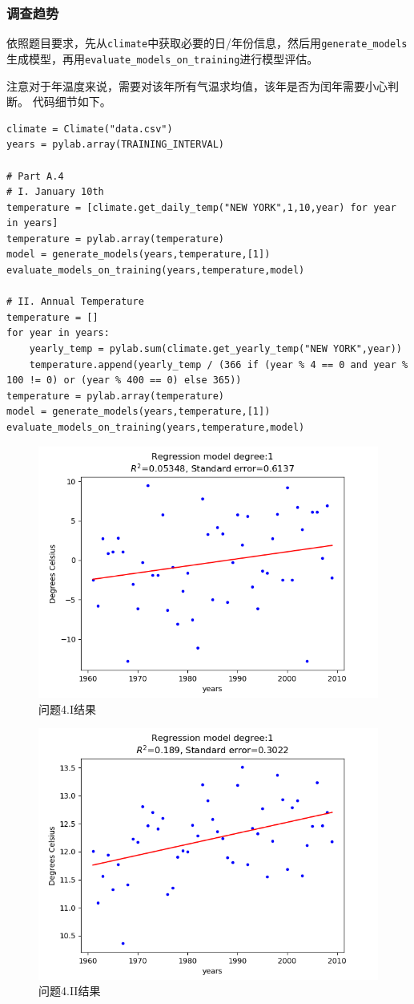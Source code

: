 \documentclass[logo,reportComp]{thesis}
\begin{document}
\subsubsection{调查趋势}
依照题目要求，先从\verb'climate'中获取必要的日/年份信息，然后用\verb'generate_models'生成模型，再用\verb'evaluate_models_on_training'进行模型评估。

注意对于年温度来说，需要对该年所有气温求均值，该年是否为闰年需要小心判断。
代码细节如下。
\begin{lstlisting}
climate = Climate("data.csv")
years = pylab.array(TRAINING_INTERVAL)

# Part A.4
# I. January 10th
temperature = [climate.get_daily_temp("NEW YORK",1,10,year) for year in years]
temperature = pylab.array(temperature)
model = generate_models(years,temperature,[1])
evaluate_models_on_training(years,temperature,model)

# II. Annual Temperature
temperature = []
for year in years:
    yearly_temp = pylab.sum(climate.get_yearly_temp("NEW YORK",year))
    temperature.append(yearly_temp / (366 if (year % 4 == 0 and year % 100 != 0) or (year % 400 == 0) else 365))
temperature = pylab.array(temperature)
model = generate_models(years,temperature,[1])
evaluate_models_on_training(years,temperature,model)
\end{lstlisting}

\begin{figure}[H]
\centering
\includegraphics[width=0.6\linewidth]{fig/4I.png}
\caption{问题4.I结果}
\end{figure}
\begin{figure}[H]
\centering
\includegraphics[width=0.6\linewidth]{fig/4II.png}
\caption{问题4.II结果}
\end{figure}
\end{document}
